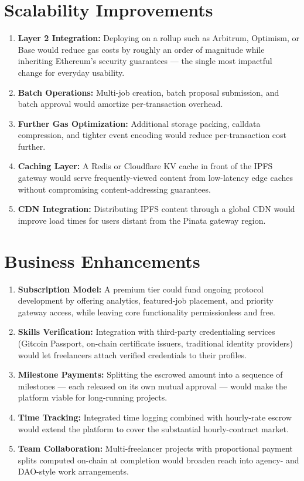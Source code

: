 \section{Scalability Improvements}

\begin{enumerate}
    \item \textbf{Layer 2 Integration:} Deploying on a rollup such as Arbitrum, Optimism, or Base would reduce gas costs by roughly an order of magnitude while inheriting Ethereum's security guarantees --- the single most impactful change for everyday usability.
    \item \textbf{Batch Operations:} Multi-job creation, batch proposal submission, and batch approval would amortize per-transaction overhead.
    \item \textbf{Further Gas Optimization:} Additional storage packing, calldata compression, and tighter event encoding would reduce per-transaction cost further.
    \item \textbf{Caching Layer:} A Redis or Cloudflare KV cache in front of the IPFS gateway would serve frequently-viewed content from low-latency edge caches without compromising content-addressing guarantees.
    \item \textbf{CDN Integration:} Distributing IPFS content through a global CDN would improve load times for users distant from the Pinata gateway region.
\end{enumerate}

\section{Business Enhancements}

\begin{enumerate}
    \item \textbf{Subscription Model:} A premium tier could fund ongoing protocol development by offering analytics, featured-job placement, and priority gateway access, while leaving core functionality permissionless and free.
    \item \textbf{Skills Verification:} Integration with third-party credentialing services (Gitcoin Passport, on-chain certificate issuers, traditional identity providers) would let freelancers attach verified credentials to their profiles.
    \item \textbf{Milestone Payments:} Splitting the escrowed amount into a sequence of milestones --- each released on its own mutual approval --- would make the platform viable for long-running projects.
    \item \textbf{Time Tracking:} Integrated time logging combined with hourly-rate escrow would extend the platform to cover the substantial hourly-contract market.
    \item \textbf{Team Collaboration:} Multi-freelancer projects with proportional payment splits computed on-chain at completion would broaden reach into agency- and DAO-style work arrangements.
\end{enumerate}

